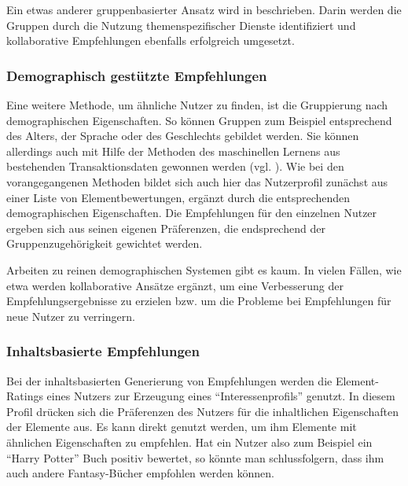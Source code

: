 Ein etwas anderer gruppenbasierter Ansatz wird in \citep{smyth05a} beschrieben. Darin werden die Gruppen durch die Nutzung themenspezifischer Dienste identifiziert und kollaborative Empfehlungen ebenfalls erfolgreich umgesetzt.


\subsubsection{Demographisch gestützte Empfehlungen}
Eine weitere Methode, um ähnliche Nutzer zu finden, ist die Gruppierung nach demographischen Eigenschaften. So können Gruppen zum Beispiel entsprechend des Alters, der Sprache oder des Geschlechts gebildet werden. Sie können allerdings auch mit Hilfe der Methoden des maschinellen Lernens aus bestehenden Transaktionsdaten gewonnen werden (vgl. \citep{Burke:2002:HRS:586321.586352}). Wie bei den vorangegangenen Methoden bildet sich auch hier das Nutzerprofil zunächst aus einer Liste von Elementbewertungen, ergänzt durch die entsprechenden demographischen Eigenschaften. Die Empfehlungen für den einzelnen Nutzer ergeben sich aus seinen eigenen Präferenzen, die endsprechend der Gruppenzugehörigkeit gewichtet werden.

Arbeiten zu reinen demographischen Systemen gibt es kaum. In vielen Fällen, wie etwa \citep{Vozalis:2007:USD:1243505.1243639} werden kollaborative Ansätze ergänzt, um eine Verbesserung der Empfehlungsergebnisse zu erzielen bzw. um die Probleme bei Empfehlungen für neue Nutzer zu verringern. \citep{Burke:2002:HRS:586321.586352}

\subsubsection{Inhaltsbasierte Empfehlungen}\label{rec:contentrec}
Bei der inhaltsbasierten Generierung von Empfehlungen werden die Element-Ratings eines Nutzers zur Erzeugung eines ``Interessenprofils'' genutzt. In diesem Profil drücken sich die Präferenzen des Nutzers für die inhaltlichen Eigenschaften der Elemente aus. Es kann direkt genutzt werden, um ihm Elemente mit ähnlichen Eigenschaften zu empfehlen. Hat ein Nutzer also zum Beispiel ein ``Harry Potter'' Buch positiv bewertet, so könnte man schlussfolgern, dass ihm auch andere Fantasy-Bücher empfohlen werden können.

